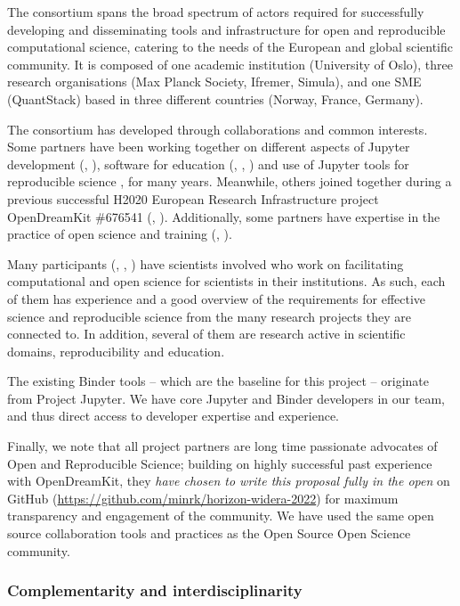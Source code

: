 The \TheProject consortium spans the broad spectrum of actors required for
successfully developing and disseminating tools and infrastructure for open and
reproducible computational science, catering to the needs of the European and
global scientific community. It is composed of one academic institution
(University of Oslo), three research organisations (Max Planck Society, Ifremer,
Simula), and one SME (QuantStack) based in three different countries (Norway,
France, Germany).

The consortium has developed through collaborations and common interests. Some
partners have been working together on different aspects of Jupyter development
(, ), software for education (, ,
) and use of Jupyter tools for reproducible science {,
  } for many years. Meanwhile, others joined together during a
previous successful H2020 European Research Infrastructure project OpenDreamKit
\#676541 (, ). Additionally, some partners have expertise in
the practice of open science and training (, ).

Many participants (, , ) have scientists involved who work on
facilitating computational and open science for scientists in their
institutions. As such, each of them has experience and a good overview of the
requirements for effective science and reproducible science from the many
research projects they are connected to. In addition, several of them are
research active in scientific domains, reproducibility and education.

The existing Binder tools -- which are the baseline for this project --
originate from Project Jupyter. We have core Jupyter and Binder developers in
our team, and thus direct access to developer expertise and experience.

Finally, we note that all project partners are long time passionate advocates of
Open and Reproducible Science; building on highly successful past experience
with OpenDreamKit, they \emph{have chosen to write this proposal fully in the
  open} on GitHub
(\href{https://github.com/minrk/horizon-widera-2022}{https://github.com/minrk/horizon-widera-2022})
for maximum transparency and engagement of the community. We have used the same
open source collaboration tools and practices as the Open Source Open Science
community.

\subsubsection{Complementarity and interdisciplinarity}

